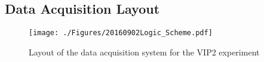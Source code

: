 \begin{appendices}
\chapter{Data Acquisition Layout}


\begin{figure}[h]
 \centering
 \texttt{[image: ./Figures/20160902Logic\_Scheme.pdf]}
 \caption{Layout of the data acquisition system for the VIP2 experiment}
 \label{fig:logic_scheme}
\end{figure}


\end{appendices}